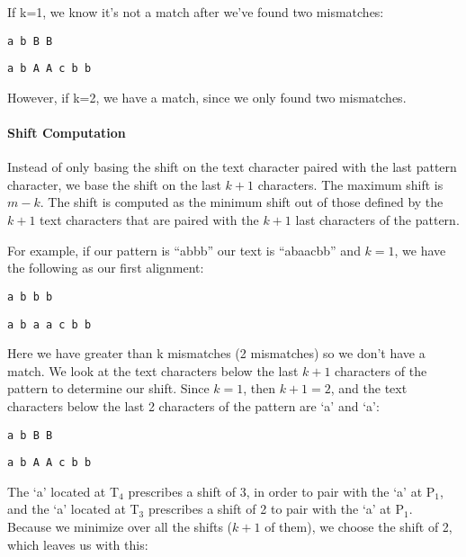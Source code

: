 \documentclass[10pt]{article}
\begin{document}
\vspace{12pt}

If k=1, we know it's not a match after we’ve found two mismatches:

\vspace{12pt}

\noindent \verb/a b B B/

\noindent \verb/a b A A c b b/

\vspace{12pt}

However, if k=2, we have a match, since we only found two mismatches.

\paragraph{Shift Computation}
Instead of only basing the shift on the text character paired with the last pattern character, we base the shift on the
last $k+1$ characters. The maximum shift is $m-k$. The shift is computed as the minimum shift out of those defined by the
$k+1$ text characters that are paired with the $k+1$ last characters of the pattern.

For example, if our pattern is ``abbb'' our text is ``abaacbb'' and $k=1$, we have the following as our first alignment:

\vspace{12pt}

\noindent \verb/a b b b/

\noindent \verb/a b a a c b b/

\vspace{12pt}

Here we have greater than k mismatches (2 mismatches) so we don't have a match. We look at the text characters below the
last $k+1$ characters of the pattern to determine our shift. Since $k = 1$, then $k+1 = 2$, and the text characters below the
last 2 characters of the pattern are `a' and `a':

\vspace{12pt}

\noindent \verb/a b B B/

\noindent \verb/a b A A c b b/

\vspace{12pt}

The `a' located at T$_{4}$ prescribes a shift of 3, in order to pair with the `a' at P$_{1}$, and the `a' located at T$_{3}$ prescribes
a shift of 2 to pair with the `a' at P$_{1}$. Because we minimize over all the shifts ($k+1$ of them), we choose the shift of
2, which leaves us with this:
\end{document}
